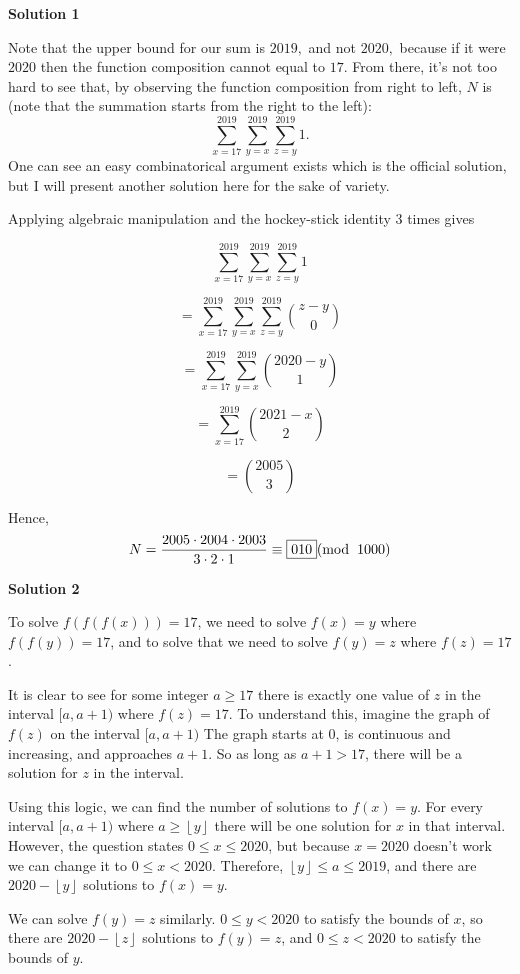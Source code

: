 \begin{enumerate}
\textbf{Solution 1}

Note that the upper bound for our sum is $2019,$ and not $2020,$ because if it were $2020$ then the function composition cannot equal to $17.$ From there, it's not too hard to see that, by observing the function composition from right to left, $N$ is (note that the summation starts from the right to the left):
 \[\sum_{x=17}^{2019} \sum_{y=x}^{2019} \sum_{z=y}^{2019} 1 .\]One can see an easy combinatorical argument exists which is the official solution, but I will present another solution here for the sake of variety.

 Applying algebraic manipulation and the hockey-stick identity $3$ times gives

 
 \[\sum_{x=17}^{2019} \sum_{y=x}^{2019} \sum_{z=y}^{2019} 1\]

 \[=\sum_{x=17}^{2019} \sum_{y=x}^{2019} \sum_{z=y}^{2019} \binom{z-y}{0}\]

 \[=\sum_{x=17}^{2019} \sum_{y=x}^{2019} \binom{2020-y}{1}\]

 \[=\sum_{x=17}^{2019} \binom{2021-x}{2}\]

 \[=\binom{2005}{3}\]

 Hence, 
 \[N = \frac{2005 \cdot 2004 \cdot 2003}{3 \cdot 2\cdot 1} \equiv \boxed{010} (\mathrm{mod} \hskip .2cm 1000)\]




\textbf{Solution 2}

To solve $f(f(f(x)))=17$, we need to solve $f(x) = y$ where $f(f(y))=17$, and to solve that we need to solve $f(y) = z$ where $f(z) = 17$.

 It is clear to see for some integer $a \geq 17$ there is exactly one value of $z$ in the interval $[a, a+1)$ where $f(z) = 17$. To understand this, imagine the graph of $f(z)$ on the interval $[a, a+1)$ The graph starts at $0$, is continuous and increasing, and approaches $a+1$. So as long as $a+1 > 17$, there will be a solution for $z$ in the interval.

 Using this logic, we can find the number of solutions to $f(x) = y$. For every interval $[a, a+1)$ where $a \geq \left \lfloor{y}\right \rfloor$ there will be one solution for $x$ in that interval. However, the question states $0 \leq x \leq 2020$, but because $x=2020$ doesn't work we can change it to $0 \leq x < 2020$. Therefore, $\left \lfloor{y}\right \rfloor  \leq a \leq 2019$, and there are $2020 - \left \lfloor{y}\right \rfloor$ solutions to $f(x) = y$.

 We can solve $f(y) = z$ similarly. $0 \leq y < 2020$ to satisfy the bounds of $x$, so there are $2020 - \left \lfloor{z}\right \rfloor$ solutions to $f(y) = z$, and $0 \leq z < 2020$ to satisfy the bounds of $y$.


\end{enumerate}
